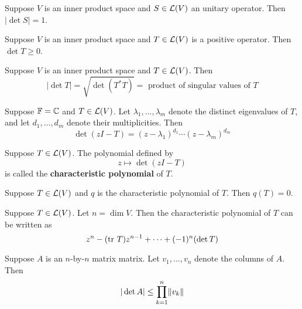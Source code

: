 \documentclass{extarticle}
\begin{document}
\begin{corollary}
    Suppose \(V\) is an inner product space and \(S \in \mathcal{L}(V)\) an unitary operator. Then 
    \(|\det S| = 1\).
\end{corollary}

\begin{corollary}
    Suppose \(V\) is an inner product space and \(T \in \mathcal{L}(V)\) is a positive operator. Then 
    \(\det T \geq 0\).
\end{corollary}

\begin{corollary}
    Suppose \(V\) is an inner product space and \(T \in \mathcal{L}(V)\). Then 
    \[|\det T| = \sqrt{\det (T^* T)} = \text{ product of singular values of } T\]
\end{corollary}

\begin{lemma}
    Suppose \(\mathbb{F} = \mathbb{C}\) and \(T \in \mathcal{L}(V)\). Let \(\lambda_1, \ldots, \lambda_m\) denote the distinct 
    eigenvalues of \(T\), and let \(d_1, \ldots, d_m\) denote their multiplicities. Then 
    \[\det (zI - T) = (z - \lambda_1)^{d_1} \cdots (z - \lambda_m)^{d_m}\]
\end{lemma}

\begin{definition}
    Suppose \(T \in \mathcal{L}(V)\). The polynomial defined by 
    \[z \mapsto \det (zI - T)\]
    is called the \textbf{characteristic polynomial} of \(T\).
\end{definition}

\begin{thm}
    Suppose \(T \in \mathcal{L}(V)\) and \(q\) is the characteristic polynomial of \(T\). Then \(q(T) = 0\).
\end{thm}

\begin{corollary}
    Suppose \(T \in \mathcal{L}(V)\). Let \(n = \dim V\). Then the characteristic polynomial of \(T\) can be written 
    as 
    \[z^n - (\text{tr} \ T) z^{n-1} + \cdots  + (-1)^n (\det T)\]
\end{corollary}

\begin{thm}
    Suppose \(A\) is an \(n\)-by-\(n\) matrix matrix. Let \(v_1, \ldots, v_n\) denote the columns of \(A\). Then 
    \[|\det A| \leq \prod_{k=1}^{n} \norm{v_k}\]
\end{thm}
\end{document}
